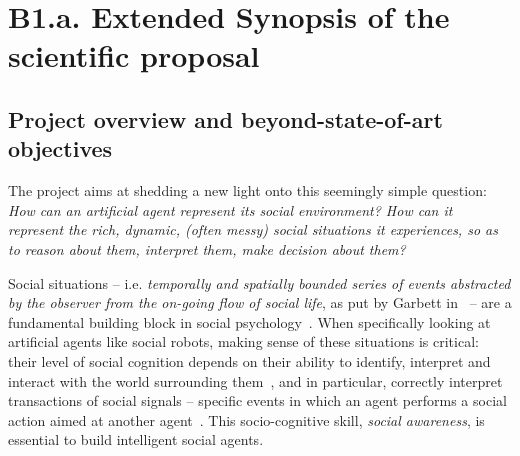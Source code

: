 
\newrefsection


\chapter{B1.a. Extended Synopsis of the scientific proposal}\label{part1}




\section{Project overview and beyond-state-of-art objectives}

The \project project aims at shedding a new light onto this seemingly simple
question: \emph{How can an artificial agent represent its social environment?
How can it represent the rich, dynamic, (often messy) social situations it
experiences, so as to reason about them, interpret them, make
decision about them?}

Social situations -- i.e. \emph{temporally and spatially bounded series of
events abstracted by the observer from the on-going flow of social life}, as put
by Garbett in~\cite{garbett1970analysis} -- are a fundamental building block in
social psychology~\cite{argyle1981social}. When specifically looking at
artificial agents like social robots, making sense of these situations is
critical: their level of social cognition depends on their ability to identify,
interpret and interact with the world surrounding
them~\cite{szczepanowski2017computational}, and in particular, correctly
interpret transactions of social signals -- specific events in which an agent
performs a social action aimed at another agent~\cite{pantic2011social}. This
socio-cognitive skill, \emph{social awareness}, is essential to build
intelligent social agents.

